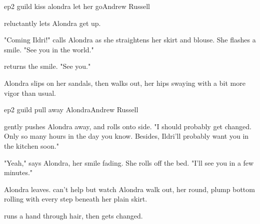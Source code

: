 \documentclass{book}
\begin{document}
\begin{childnode}{ep2 guild kiss alondra let her go}{Andrew Russell}

    \name{} reluctantly lets Alondra get up.

    "Coming Ildri!" calls Alondra as she straightens her skirt and blouse. She flashes \name{} a smile. "See you in the world."

    \name{} returns the smile. "See you."

    Alondra slips on her sandals, then walks out, her hips swaying with a bit more vigor than usual.

\end{childnode}

\begin{childnode}{ep2 guild pull away Alondra}{Andrew Russell}

    \name{} gently pushes Alondra away, and rolls onto \hisher{} side. "I should probably get changed. Only so many hours in the day you know. Besides, Ildri'll probably want you in the kitchen soon."

    "Yeah," says Alondra, her smile fading. She rolls off the bed. "I'll see you in a few minutes."

    Alondra leaves. \name{} can't help but watch Alondra walk out, her round, plump bottom rolling with every step beneath her plain skirt.

     runs a hand through \hisher{} hair, then gets changed. 

\end{childnode}
\end{document}
